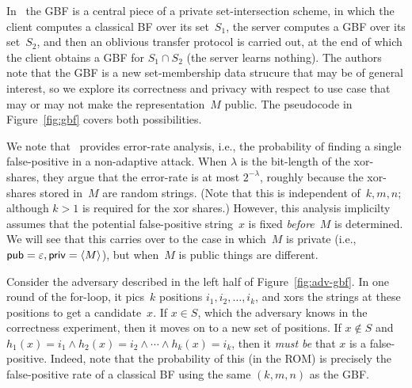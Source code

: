 In~\cite{xxx} the GBF is a central piece of a private set-intersection
scheme, in which the client computes a classical BF over its
set~$S_1$, the server computes a GBF over its set~$S_2$, and then an
oblivious transfer protocol is carried out, at the end of which the
client obtains a GBF for $S_1 \cap S_2$ (the server learns nothing).
The authors note that the GBF is a new set-membership data strucure
that may be of general interest, so we explore its correctness and
privacy with respect to use case that may or may not make the
representation~$M$ public. The pseudocode in Figure~\ref{fig:gbf}
covers both possibilities.

We note that~\cite{xxx} provides error-rate analysis, i.e., the
probability of finding a single false-positive in a non-adaptive
attack.  When $\lambda$ is the bit-length of the xor-shares, they
argue that the error-rate is at most $2^{-\lambda}$, roughly because
the xor-shares stored in~$M$ are random strings.  (Note that
  this is independent of~$k,m,n$; although $k>1$ is required for the
  xor shares.)  However, this analysis implicilty assumes that the potential false-positive string~$x$ is fixed
\emph{before}~$M$ is determined.  We will see that this carries over
 to the case in which~$M$ is private (i.e.,
${\sf pub}=\varepsilon,{\sf priv}=\langle M \rangle$), but when~$M$ is
public things are different.

Consider the adversary described in the left half of Figure~\ref{fig:adv-gbf}.  In one
round of the for-loop, it pics~$k$ positions $i_1,i_2,\ldots,i_k$, and
xors the strings at these positions to get a candidate~$x$.   If $x
\in S$, which the adversary knows in the correctness experiment, then
it moves on to a new set of positions.  If $x \not\in S$ and
$h_{1}(x)=i_1 \wedge h_2(x)=i_2 \wedge \cdots \wedge h_k(x) = i_k$,
then it \emph{must be} that $x$ is a false-positive.   Indeed, note
that the probability of this (in the ROM) is precisely the
false-positive rate of a classical BF using the same $(k,m,n)$ as the GBF.

